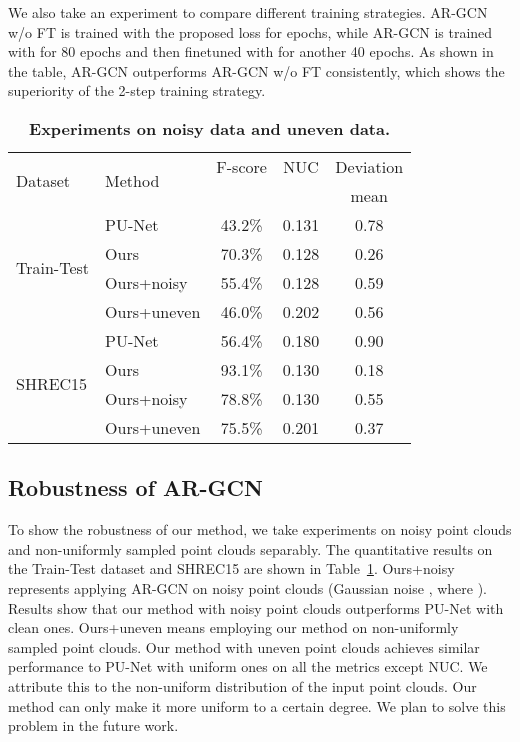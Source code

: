 \documentclass[10pt,twocolumn,letterpaper]{article}
\begin{document}
We also take an experiment to compare different training strategies.
AR-GCN w/o FT is trained with the proposed loss  for  epochs, while AR-GCN is trained with  for 80 epochs and then finetuned with  for another 40 epochs.
As shown in the table, AR-GCN outperforms AR-GCN w/o FT consistently, which shows the superiority of the 2-step training strategy.

\begin{table}[!t]
\small
\begin{center}
\begin{tabular}{l|l|c|c|c}
\hline
\multirow{2}{*}{Dataset} & \multirow{2}{*}{Method} & \multicolumn{1}{c}{F-score} & \multicolumn{1}{|c}{NUC} & \multicolumn{1}{|c}{Deviation}\\
\cline{3-5}
& &  &  & mean \\
\hline
\multirow{4}{*}{Train-Test} & PU-Net & 43.2\% & 0.131 & 0.78 \\
& Ours & 70.3\% & 0.128 & 0.26 \\
\cline{2-5}
& Ours+noisy & 55.4\% & 0.128 & 0.59 \\
\cline{2-5}
& Ours+uneven & 46.0\% & 0.202 & 0.56 \\
\hline
\hline
\multirow{4}{*}{SHREC15} & PU-Net & 56.4\% & 0.180 & 0.90 \\
& Ours & 93.1\% & 0.130 & 0.18 \\
\cline{2-5}
& Ours+noisy & 78.8\% & 0.130 & 0.55 \\
\cline{2-5}
& Ours+uneven & 75.5\% & 0.201 & 0.37 \\
\hline
\end{tabular}
\end{center}
	\vspace{-1.5em}
	\caption{\textbf{Experiments on noisy data and uneven data.}}
	\vspace{-1em}
	\label{table:noisy_uneven}
\end{table}

\subsection{Robustness of AR-GCN}
To show the robustness of our method, we take experiments on noisy point clouds and non-uniformly sampled point clouds separably.
The quantitative results on the Train-Test dataset and SHREC15 are shown in Table~\ref{table:noisy_uneven}.
Ours+noisy represents applying AR-GCN on noisy point clouds (Gaussian noise , where ).
Results show that our method with noisy point clouds outperforms PU-Net with clean ones.
Ours+uneven means employing our method on non-uniformly sampled point clouds.
Our method with uneven point clouds achieves similar performance to PU-Net with uniform ones on all the metrics except NUC.
We attribute this to the non-uniform distribution of the input point clouds.
Our method can only make it more uniform to a certain degree.
We plan to solve this problem in the future work.
\end{document}
